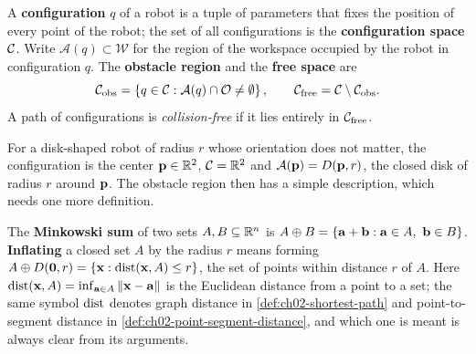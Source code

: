 \begin{definition}
\label{def:ch02-configuration-space}
A \textbf{configuration} $q$ of a robot is a tuple of parameters that fixes the position of every point of the robot; the set of all configurations is the \textbf{configuration space} $\mathcal{C}$. Write $\mathcal{A}(q)\subset\mathcal{W}$ for the region of the workspace occupied by the robot in configuration $q$. The \textbf{obstacle region} and the \textbf{free space} are
\begin{equation}
\mathcal{C}_{\mathrm{obs}}=\left\{ q\in\mathcal{C} : \mathcal{A}(q)\cap\mathcal{O}\neq\emptyset \right\},\qquad
\mathcal{C}_{\mathrm{free}}=\mathcal{C}\setminus\mathcal{C}_{\mathrm{obs}} .
\label{eq:ch02-cfree}
\end{equation}
A path of configurations is \emph{collision-free} if it lies entirely in $\mathcal{C}_{\mathrm{free}}$.
\end{definition}

For a disk-shaped robot of radius $r$ whose orientation does not matter, the configuration is the center $\mathbf{p}\in\mathbb{R}^2$, $\mathcal{C}=\mathbb{R}^2$ and $\mathcal{A}(\mathbf{p})=D(\mathbf{p},r)$, the closed disk of radius $r$ around $\mathbf{p}$. The obstacle region then has a simple description, which needs one more definition.

\begin{definition}
\label{def:ch02-minkowski-sum}
The \textbf{Minkowski sum} of two sets $A,B\subseteq\mathbb{R}^n$ is $A\oplus B=\set{\vect{a}+\vect{b} : \vect{a}\in A,\ \vect{b}\in B}$. \textbf{Inflating} a closed set $A$ by the radius $r$ means forming $A\oplus D(\mathbf{0},r)=\left\{ \mathbf{x} : \operatorname{dist}(\mathbf{x},A)\le r \right\}$, the set of points within distance $r$ of $A$. Here $\operatorname{dist}(\mathbf{x},A)=\inf_{\mathbf{a}\in A}\left\lVert \mathbf{x}-\mathbf{a} \right\rVert$ is the Euclidean distance from a point to a set; the same symbol $\operatorname{dist}$ denotes graph distance in \cref{def:ch02-shortest-path} and point-to-segment distance in \cref{def:ch02-point-segment-distance}, and which one is meant is always clear from its arguments.
\end{definition}

